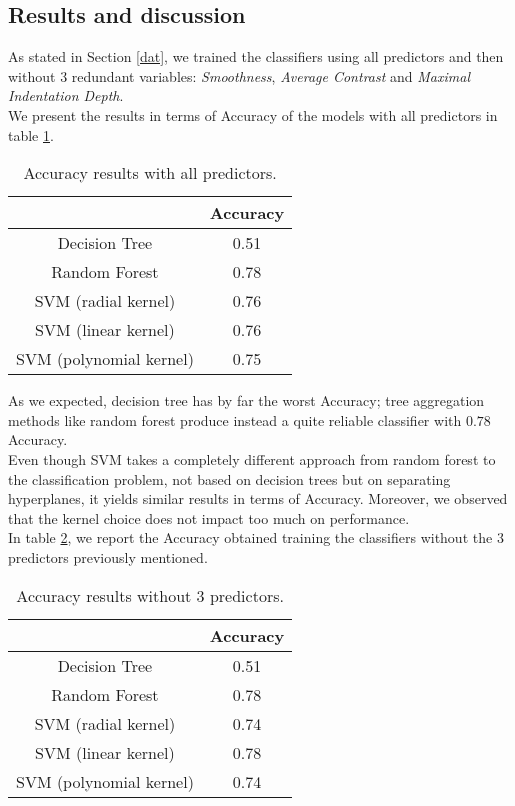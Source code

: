 \documentclass{article}
\begin{document}
\subsection{Results and discussion}
As stated in Section \ref{dat}, we trained the classifiers using all predictors and then without $3$ redundant variables: \textit{Smoothness}, \textit{Average Contrast} and \textit{Maximal} \textit{Indentation Depth}. 
\\We present the results in terms of Accuracy of the models with all predictors in table \ref{table1}. 
\begin{table}[ht]
 \centering
\begin{tabular}{ |c|c|} \hline
 & Accuracy \\
\hline
Decision Tree & 0.51 \\ 
\hline
 Random Forest & 0.78  \\ 
\hline
 SVM (radial kernel) & 0.76 \\ 
\hline
 SVM (linear kernel) & 0.76 \\ 
\hline
 SVM (polynomial kernel) & 0.75 \\ 
\hline
\end{tabular}
\caption{Accuracy results with all predictors.}\label{table1}
\end{table}

As we expected, decision tree has by far the worst Accuracy; tree aggregation methods like random forest produce instead a quite reliable classifier with $0.78$ Accuracy. 
\\Even though SVM takes a completely different approach from random forest to the classification problem, not based on decision trees but on separating hyperplanes, it yields similar results in terms of Accuracy. Moreover, we observed that the kernel choice does not impact too much on performance.
\\In table \ref{table2}, we report the Accuracy obtained training the classifiers without the $3$ predictors previously mentioned.
\newpage

\begin{table}[ht]
 \centering
\begin{tabular}{ |c|c|} \hline
 &  Accuracy \\
\hline
Decision Tree & 0.51 \\ 
\hline
 Random Forest & 0.78 \\ 
\hline
 SVM (radial kernel) & 0.74 \\ 
\hline
 SVM (linear kernel) & 0.78  \\ 
\hline
 SVM (polynomial kernel) & 0.74 \\ 
\hline
\end{tabular}
\caption{Accuracy results without $3$ predictors.}\label{table2}
\end{table}
\end{document}
